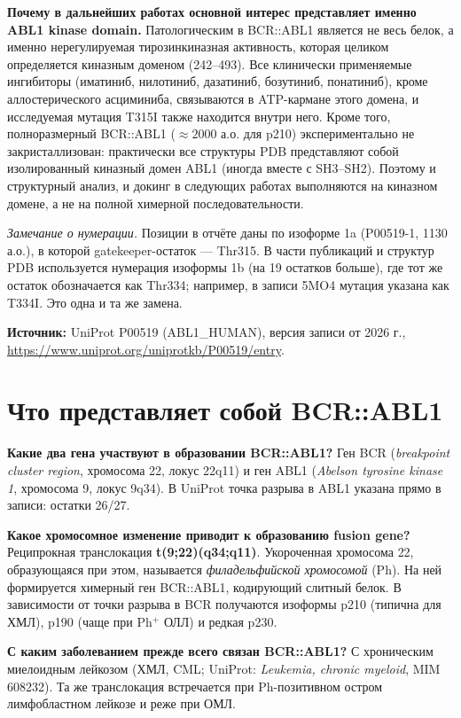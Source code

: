 \documentclass[12pt,a4paper]{article}
\newcommand{\code}[1]{{\ttfamily #1}}
\begin{document}
\medskip
\noindent\textbf{Почему в дальнейших работах основной интерес представляет именно ABL1 kinase domain.}
Патологическим в BCR::ABL1 является не весь белок, а именно нерегулируемая тирозинкиназная
активность, которая целиком определяется киназным доменом (242--493). Все клинически
применяемые ингибиторы (иматиниб, нилотиниб, дазатиниб, бозутиниб, понатиниб), кроме
аллостерического асциминиба, связываются в ATP-кармане этого домена, и исследуемая
мутация T315I также находится внутри него. Кроме того, полноразмерный BCR::ABL1
(${\approx}2000$ а.о. для p210) экспериментально не закристаллизован: практически все
структуры PDB представляют собой изолированный киназный домен ABL1 (иногда вместе с
SH3--SH2). Поэтому и структурный анализ, и докинг в следующих работах выполняются на
киназном домене, а не на полной химерной последовательности.

\medskip
\noindent\emph{Замечание о нумерации.} Позиции в отчёте даны по изоформе 1a
(\code{P00519-1}, 1130 а.о.), в которой gatekeeper-остаток --- Thr315. В части
публикаций и структур PDB используется нумерация изоформы 1b (на 19 остатков больше),
где тот же остаток обозначается как Thr334; например, в записи \code{5MO4} мутация
указана как \code{T334I}. Это одна и та же замена.

\medskip
\noindent\textbf{Источник:} UniProt P00519 (ABL1\_HUMAN), версия записи от 2026 г.,
\url{https://www.uniprot.org/uniprotkb/P00519/entry}.

\section{Что представляет собой BCR::ABL1}

\textbf{Какие два гена участвуют в образовании BCR::ABL1?} Ген \code{BCR}
(\emph{breakpoint cluster region}, хромосома 22, локус 22q11) и ген \code{ABL1}
(\emph{Abelson tyrosine kinase 1}, хромосома 9, локус 9q34). В UniProt точка разрыва
в ABL1 указана прямо в записи: остатки 26/27.

\medskip
\textbf{Какое хромосомное изменение приводит к образованию fusion gene?}
Реципрокная транслокация \textbf{t(9;22)(q34;q11)}. Укороченная хромосома 22,
образующаяся при этом, называется \emph{филадельфийской хромосомой} (Ph). На ней
формируется химерный ген \code{BCR::ABL1}, кодирующий слитный белок. В зависимости
от точки разрыва в BCR получаются изоформы p210 (типична для ХМЛ), p190 (чаще при
Ph$^+$ ОЛЛ) и редкая p230.

\medskip
\textbf{С каким заболеванием прежде всего связан BCR::ABL1?}
С хроническим миелоидным лейкозом (ХМЛ, CML; UniProt: \emph{Leukemia, chronic myeloid},
MIM 608232). Та же транслокация встречается при Ph-позитивном остром лимфобластном
лейкозе и реже при ОМЛ.
\end{document}
